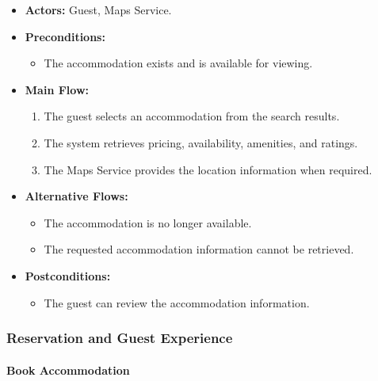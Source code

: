 \begin{itemize}
    \item \textbf{Actors:} Guest, Maps Service.
    
    \item \textbf{Preconditions:}
    \begin{itemize}
        \item The accommodation exists and is available for viewing.
    \end{itemize}
    
    \item \textbf{Main Flow:}
    \begin{enumerate}
        \item The guest selects an accommodation from the search results.
        \item The system retrieves pricing, availability, amenities, and ratings.
        \item The Maps Service provides the location information when required.
    \end{enumerate}
    
    \item \textbf{Alternative Flows:}
    \begin{itemize}
        \item The accommodation is no longer available.
        \item The requested accommodation information cannot be retrieved.
    \end{itemize}
    
    \item \textbf{Postconditions:}
    \begin{itemize}
        \item The guest can review the accommodation information.
    \end{itemize}
\end{itemize}


\subsubsection{Reservation and Guest Experience}

\paragraph{Book Accommodation}


